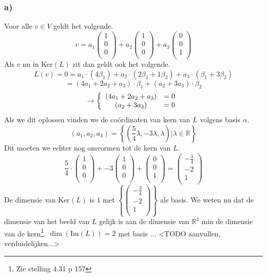 \documentclass[lineaire_algebra_oplossingen.tex]{subfiles}
\begin{document}
\subsubsection*{a)}
Voor alle $v \in V$ geldt het volgende.
\[
v
=
a_1
\begin{pmatrix}
1\\0\\0\\
\end{pmatrix}
+
a_2
\begin{pmatrix}
1\\0\\0\\
\end{pmatrix}
+
a_3
\begin{pmatrix}
0\\0\\1\\
\end{pmatrix}
\]
Als $v$ nu in $\text{Ker}(L)$ zit dan geldt ook het volgende.
\[
L(v) = 0 = a_1 \cdot (4\beta_1) + a_2 \cdot (2 \beta_1 + 1\beta_2) + a_3 \cdot (\beta_1 + 3\beta_2)
\]
\[
= (4a_1+2a_2+a_3)\cdot\beta_1 + (a_2+3a_3)\cdot\beta_2
\]
\[
\rightarrow
\left\lbrace
\begin{array}{c c}
(4a_1+2a_2+a_3) &= 0\\
(a_2+3a_3) &= 0\\
\end{array}
\right.
\]
Als we dit oplossen vinden we de co\"ordinaten van kern van $L$ volgens basis $\alpha$.
\[
(a_1,a_2,a_3) = 
\left\{(\frac{5}{4}\lambda,-3\lambda,\lambda) | \lambda \in \mathbb{R}\right\}
\]
Dit moeten we echter nog omvormen tot de kern van $L$.
\[
\frac{5}{4}\cdot
\begin{pmatrix}
1\\0\\0\\
\end{pmatrix}
+
-3
\begin{pmatrix}
1\\0\\0\\
\end{pmatrix}
+
\begin{pmatrix}
0\\0\\1\\
\end{pmatrix}
=
\begin{pmatrix}
-\frac{3}{4}\\-2\\1\\
\end{pmatrix}
\]
De dimensie van $\text{Ker}(L)$ is $1$ met $\left\{\begin{pmatrix}-\frac{3}{4}\\-2\\1\\\end{pmatrix}\right\}$ als basis.
We weten nu dat de dimensie van het beeld van $L$ gelijk is aan de dimensie van $\mathbb{R}^3$ min de dimensie van de kern\footnote{Zie stelling 4.31 p 157}. $\dim (\text{Im}(L))= 2$ met basis ... <TODO aanvullen, verduidelijken...>
\end{document}
